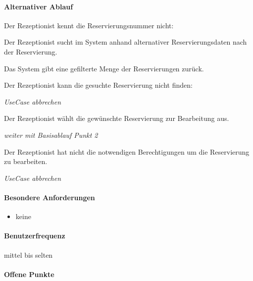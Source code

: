\paragraph{Alternativer Ablauf}
\begin{longenum}
	\item
	\begin{longenum}
		\item Der Rezeptionist kennt die \Gls{Reservierungsnummer} nicht:
		\begin{longenum}
			\item Der \Gls{Rezeptionist} sucht im System anhand alternativer Reservierungsdaten nach der \Gls{Reservierung}.
			\item Das System gibt eine gefilterte Menge der \Gls{Reservierung}en zurück.
			\begin{longenum}
				\item Der \Gls{Rezeptionist} kann die gesuchte Reservierung nicht finden:
				\begin{longenum}
					\item \emph{UseCase abbrechen}
				\end{longenum}
			\end{longenum}
			\item Der \Gls{Rezeptionist} wählt die gewünschte Reservierung zur Bearbeitung aus.
			\item \emph{weiter mit Basisablauf Punkt 2}
		\end{longenum}
	\end{longenum}
	\item
	\item
	\begin{longenum}
		\item Der \Gls{Rezeptionist} hat nicht die notwendigen Berechtigungen um die \Gls{Reservierung} zu bearbeiten.
		\begin{longenum}
			\item \emph{UseCase abbrechen}
		\end{longenum}
	\end{longenum}
	\item
\end{longenum}

\paragraph{Besondere Anforderungen}
\begin{itemize}
	\item keine
\end{itemize}

\paragraph{Benutzerfrequenz}
mittel bis selten

\paragraph{Offene Punkte}

\newpage

